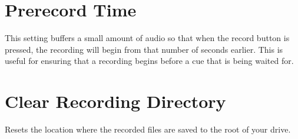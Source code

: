 \section{Prerecord Time}
    This setting buffers a small amount of audio so that when the record button
    is pressed, the recording will begin from that number of seconds earlier.
    This is useful for ensuring that a recording begins before a cue that is
    being waited for.

\section{Clear Recording Directory}
    Resets the location where the recorded files are saved to the root of your
    \daps{} drive.

